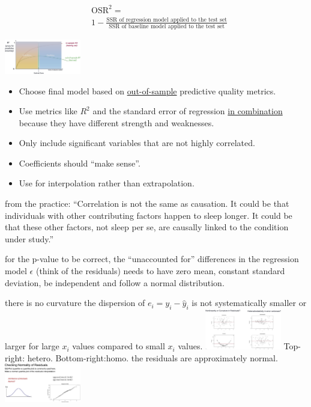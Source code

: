 \documentclass[10pt,landscape]{article}
\newcommand{\Blue}[1]{\noindent{\textbf{\textcolor{Blue}{#1 -}}}}
\newcommand{\Red}[1]{\noindent{\textbf{\textcolor{BrickRed}{#1 -}}}}
\newcommand{\Green}[1]{\noindent{\textbf{\textcolor{PineGreen}{#1 -}}}}
\begin{document}
\begin{multicols}{4}
\Green{Out-of-Sample $R^2$}
\begin{displaymath}
\boxed{
\begin{split}
        &\text{OSR}^2 = \\
        &1 - \frac{\text{SSR of regression model applied to the test set}}{\text{SSR of baseline model applied to the test set}}
\end{split}
}
\end{displaymath}

\includegraphics[width=0.25\textwidth]{overfitting.jpg}

\Red{Key takeaways}

\begin{itemize}
    \item Choose final model based on \underline{out-of-sample} predictive quality metrics.
    \item Use metrics like $R^2$ and the standard error of regression \underline{in combination} because they have different strength and weaknesses.
    \item Only include significant variables that are not highly correlated.
    \item Coefficients should ``make sense''.
    \item Use for interpolation rather than extrapolation.
\end{itemize}

\Blue{Inferring model's coefficient} from the practice: ``Correlation is not the same as causation. It could be that
individuals with other contributing factors happen to sleep longer. It could be that these other factors, not sleep per
se, are causally linked to the condition under study.''

\Red{Technical caution} for the p-value to be correct, the ``unaccounted for'' differences in the regression model
$\epsilon$ (think of the residuals) needs to have zero mean, constant standard deviation, be independent and follow a normal distribution.

\Green{Linearity} there is no curvature
\Green{Homoskedasticity} the dispersion of $e_i = y_i - \hat{y}_i$ is not systematically smaller or larger for large
$x_i$ values compared to small $x_i$ values.
\includegraphics[width=0.25\textwidth]{residuals1.jpg}
Top-right: hetero. Bottom-right:homo.
\Green{Normality} the residuals are approximately normal.
\includegraphics[width=0.25\textwidth]{residuals2.jpg}



\end{multicols}
\end{document}
